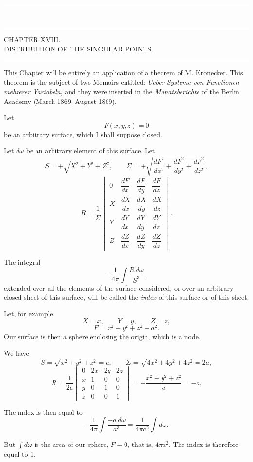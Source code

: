 \documentclass[11pt]{article}
\newcommand{\ornament}{\begin{center}\rule{2.5em}{0.4pt}\,\raisebox{0.1ex}{\tiny$\bullet\bullet\bullet$}\,\rule{2.5em}{0.4pt}\end{center}}
\newcommand{\shortline}{\begin{center}\rule{3.5em}{0.4pt}\end{center}}
\begin{document}
\ornament

\begin{center}
{\Large CHAPTER XVIII.}\\[0.6em]
{\large DISTRIBUTION OF THE SINGULAR POINTS.}
\end{center}
\shortline

This Chapter will be entirely an application of a theorem of M. Kronecker. This theorem is the subject of two Memoirs entitled: \emph{Ueber Systeme von Functionen mehrerer Variabeln}, and they were inserted in the \emph{Monatsberichte} of the Berlin Academy (March 1869, August 1869).

Let
\[
F(x,y,z)=0
\]
be an arbitrary surface, which I shall suppose closed.

Let $d\omega$ be an arbitrary element of this surface. Let
\[
S=+\sqrt{X^2+Y^2+Z^2},
\qquad
\Sigma=+\sqrt{\frac{dF^2}{dx^2}+\frac{dF^2}{dy^2}+\frac{dF^2}{dz^2}},
\]
\[
R=\frac1{\Sigma}
\begin{vmatrix}
0 & \dfrac{dF}{dx} & \dfrac{dF}{dy} & \dfrac{dF}{dz}\\
X & \dfrac{dX}{dx} & \dfrac{dX}{dy} & \dfrac{dX}{dz}\\
Y & \dfrac{dY}{dx} & \dfrac{dY}{dy} & \dfrac{dY}{dz}\\
Z & \dfrac{dZ}{dx} & \dfrac{dZ}{dy} & \dfrac{dZ}{dz}
\end{vmatrix}.
\]

The integral
\[
-\frac1{4\pi}\int\frac{R\,d\omega}{S^3},
\]
extended over all the elements of the surface considered, or over an arbitrary closed sheet of this surface, will be called the \emph{index} of this surface or of this sheet.

Let, for example,
\[
X=x,\qquad Y=y,\qquad Z=z,
\]
\[
F=x^2+y^2+z^2-a^2.
\]
Our surface is then a sphere enclosing the origin, which is a node.

We have
\[
S=\sqrt{x^2+y^2+z^2}=a,
\qquad
\Sigma=\sqrt{4x^2+4y^2+4z^2}=2a,
\]
\[
R=\frac1{2a}
\begin{vmatrix}
0&2x&2y&2z\\
x&1&0&0\\
y&0&1&0\\
z&0&0&1
\end{vmatrix}
=-\frac{x^2+y^2+z^2}{a}=-a.
\]

The index is then equal to
\[
-\frac1{4\pi}\int\frac{-a\,d\omega}{a^3}
=\frac1{4\pi a^2}\int d\omega.
\]

But $\int d\omega$ is the area of our sphere, $F=0$, that is, $4\pi a^2$. The index is therefore equal to 1.
\end{document}
